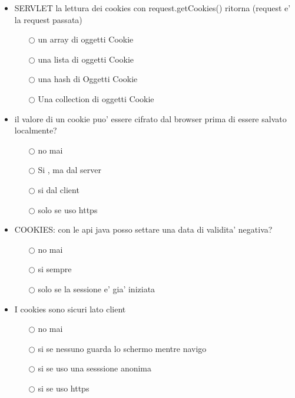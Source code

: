 \documentclass[10pt,twocolumn]{article}
\begin{document}
\begin{itemize}
    \item SERVLET la lettura dei cookies con request.getCookies() ritorna (request e' la request passata)
          \begin{itemize}
              \item[$\bigcirc$] un array di oggetti Cookie
              \item[$\bigcirc$] una lista di oggetti Cookie
              \item[$\bigcirc$] una hash di Oggetti Cookie
              \item[$\bigcirc$] Una collection di oggetti Cookie
          \end{itemize}
\end{itemize}
\begin{itemize}
    \item il valore di un cookie puo' essere cifrato dal browser prima di essere salvato localmente?
          \begin{itemize}
              \item[$\bigcirc$] no mai
              \item[$\bigcirc$] Si , ma dal server
              \item[$\bigcirc$] si dal client
              \item[$\bigcirc$] solo se uso https
          \end{itemize}
\end{itemize}
\begin{itemize}
    \item COOKIES: con le api java posso settare una data di validita' negativa?
          \begin{itemize}
              \item[$\bigcirc$] no mai
              \item[$\bigcirc$] si sempre
              \item[$\bigcirc$] solo se la sessione e' gia' iniziata
          \end{itemize}
\end{itemize}
\begin{itemize}
    \item I cookies sono sicuri lato client
          \begin{itemize}
              \item[$\bigcirc$] no mai
              \item[$\bigcirc$] si se nessuno guarda lo schermo mentre navigo
              \item[$\bigcirc$] si se uso una sesssione anonima
              \item[$\bigcirc$] si se uso https
          \end{itemize}
\end{itemize}
\end{document}
